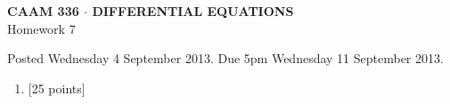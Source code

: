 \documentclass[10pt]{article}
\begin{document}
\vspace*{-5em}
\begin{center}
\large \textsf{\textbf{CAAM 336 $\cdot$ DIFFERENTIAL EQUATIONS}\\[0.5em]
Homework 7 }
\end{center}

Posted Wednesday 4 September 2013.  Due 5pm Wednesday 11 September 2013.

\begin{enumerate}\addtocounter{enumi}{6}
\item {[25 points]}\\  

\end{enumerate}
\end{document}

